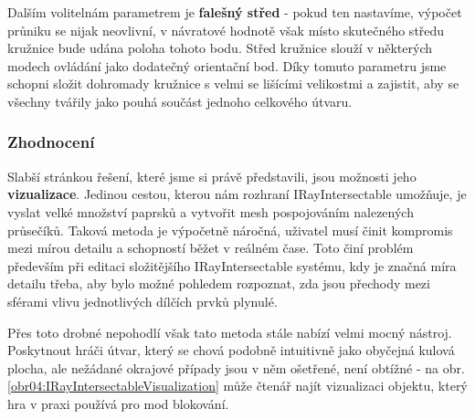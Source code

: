 Dalším volitelnám parametrem je \textbf{falešný střed} - pokud ten nastavíme, výpočet průniku se nijak neovlivní, v návratové hodnotě však místo skutečného středu kružnice bude udána poloha tohoto bodu. Střed kružnice slouží v některých modech ovládání jako dodatečný orientační bod. Díky tomuto parametru jsme schopni složit dohromady kružnice s velmi se lišícími velikostmi a zajistit, aby se všechny tvářily jako pouhá součást jednoho celkového útvaru. 

\subsubsection*{Zhodnocení}

Slabší stránkou řešení, které jsme si právě představili, jsou možnosti jeho \textbf{vizualizace}. Jedinou cestou, kterou nám rozhraní IRayIntersectable umožňuje, je vyslat velké množství paprsků a vytvořit mesh pospojováním nalezených průsečíků. Taková metoda je výpočetně náročná, uživatel musí činit kompromis mezi mírou detailu a schopností běžet v reálném čase. Toto činí problém především při editaci složitějšího IRayIntersectable systému, kdy je značná míra detailu třeba, aby bylo možné pohledem rozpoznat, zda jsou přechody mezi sférami vlivu jednotlivých dílčích prvků plynulé. 

Přes toto drobné nepohodlí však tato metoda stále nabízí velmi mocný nástroj. Poskytnout hráči útvar, který se chová podobně intuitivně jako obyčejná kulová plocha, ale nežádané okrajové případy jsou v něm ošetřené, není obtížné - na obr.\ref{obr04:IRayIntersectableVisualization} může čtenář najít vizualizaci objektu, který hra v praxi používá pro mod blokování. 

